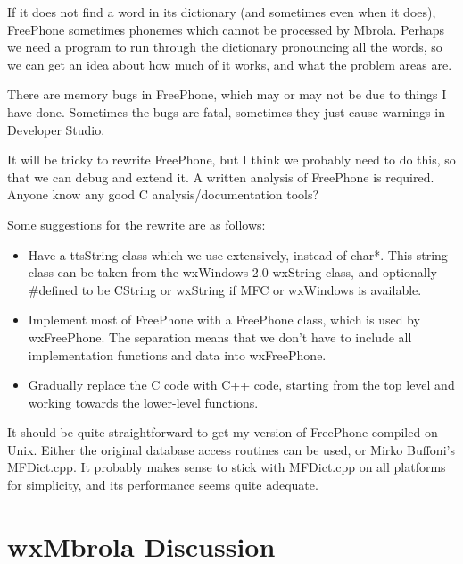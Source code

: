 
If it does not find a word in its dictionary (and sometimes even when it does), FreePhone sometimes phonemes
which cannot be processed by Mbrola. Perhaps we need a program to run through the dictionary pronouncing all the words, so
we can get an idea about how much of it works, and what the problem areas are.


There are memory bugs in FreePhone, which may or may not be due to things I have
done. Sometimes the bugs are fatal, sometimes they just cause warnings in Developer
Studio.


It will be tricky to rewrite FreePhone, but I think we probably need to
do this, so that we can debug and extend it. A written analysis of FreePhone is required.
Anyone know any good C analysis/documentation tools?

Some suggestions for the rewrite are as follows:

\begin{itemize}\itemsep=0pt
\item Have a ttsString class which we use extensively, instead of char*. This
string class can be taken from the wxWindows 2.0 wxString class, and optionally #defined
to be CString or wxString if MFC or wxWindows is available.
\item Implement most of FreePhone with a FreePhone class, which is used by wxFreePhone.
The separation means that we don't have to include all implementation functions and data
into wxFreePhone.
\item Gradually replace the C code with C++ code, starting from the top level and working
towards the lower-level functions.
\end{itemize}


It should be quite straightforward to get my version of FreePhone compiled on Unix.
Either the original database access routines can be used, or Mirko Buffoni's MFDict.cpp.
It probably makes sense to stick with MFDict.cpp on all platforms for simplicity, and
its performance seems quite adequate.

\chapter{wxMbrola Discussion}\label{mbrola}
%
\setfooter{\thepage}{}{}{}{}{\thepage}%

